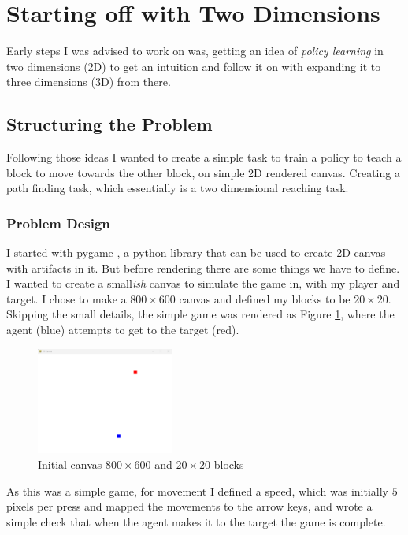 \section{Starting off with Two Dimensions}
Early steps I was advised to work on was, getting an idea of \emph{policy learning} in two dimensions (2D) to get an intuition and follow it on with expanding it to three dimensions (3D) from there.

\subsection{Structuring the Problem}\label{subsec:ew-2d-problem}
Following those ideas I wanted to create a simple task to train a policy to teach a block to move towards the other block, on simple 2D rendered canvas. Creating a path finding task, which essentially is a two dimensional reaching task.

\subsubsection{Problem Design} 
I started with pygame \cite{pygame}, a python library that can be used to create 2D canvas with artifacts in it. But before rendering there are some things we have to define. I wanted to create a small\emph{ish} canvas to simulate the game in, with my player and target. I chose to make a $800 \times 600$ canvas and defined my blocks to be $20 \times 20$. Skipping the small details, the simple game was rendered as Figure \ref{fig:initial-canvas}, where the agent (blue) attempts to get to the target (red).

\begin{figure}[h]
  \centering
  \includegraphics[width=0.4\textwidth]{assets/early-work/initial-canvas.png}
  \caption{Initial canvas $800 \times 600$ and $20 \times 20$ blocks}\label{fig:initial-canvas}
\end{figure}

As this was a simple game, for movement I defined a speed, which was initially $5$ pixels per press and mapped the movements to the arrow keys, and wrote a simple check that when the agent makes it to the target the game is complete.

